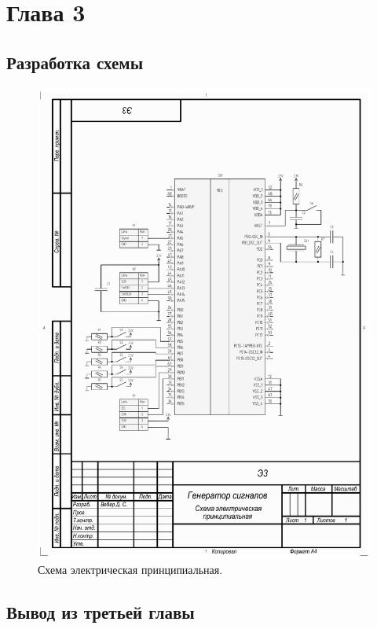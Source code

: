 \chapter{Глава 3}
\section{Разработка схемы}
\begin{figure}[H]
    \centering
    \includegraphics[width=1\textwidth]{../image/scheme-cropped.pdf}
    \caption{Схема электрическая принципиальная.}
\end{figure}

\section{Вывод из третьей главы}